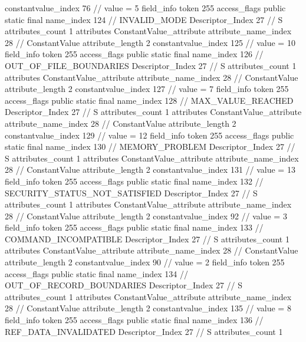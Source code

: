 {{{{{{{					constantvalue_index	76		// value = 5
				}
				}
			}
			field_info {
				token	255
				access_flags	public static final
				name_index	124		// INVALID_MODE
				Descriptor_Index	27		// S
				attributes_count	1
				attributes {
				ConstantValue_attribute {
					attribute_name_index	28		// ConstantValue
					attribute_length	2
					constantvalue_index	125		// value = 10
				}
				}
			}
			field_info {
				token	255
				access_flags	public static final
				name_index	126		// OUT_OF_FILE_BOUNDARIES
				Descriptor_Index	27		// S
				attributes_count	1
				attributes {
				ConstantValue_attribute {
					attribute_name_index	28		// ConstantValue
					attribute_length	2
					constantvalue_index	127		// value = 7
				}
				}
			}
			field_info {
				token	255
				access_flags	public static final
				name_index	128		// MAX_VALUE_REACHED
				Descriptor_Index	27		// S
				attributes_count	1
				attributes {
				ConstantValue_attribute {
					attribute_name_index	28		// ConstantValue
					attribute_length	2
					constantvalue_index	129		// value = 12
				}
				}
			}
			field_info {
				token	255
				access_flags	public static final
				name_index	130		// MEMORY_PROBLEM
				Descriptor_Index	27		// S
				attributes_count	1
				attributes {
				ConstantValue_attribute {
					attribute_name_index	28		// ConstantValue
					attribute_length	2
					constantvalue_index	131		// value = 13
				}
				}
			}
			field_info {
				token	255
				access_flags	public static final
				name_index	132		// SECURITY_STATUS_NOT_SATISFIED
				Descriptor_Index	27		// S
				attributes_count	1
				attributes {
				ConstantValue_attribute {
					attribute_name_index	28		// ConstantValue
					attribute_length	2
					constantvalue_index	92		// value = 3
				}
				}
			}
			field_info {
				token	255
				access_flags	public static final
				name_index	133		// COMMAND_INCOMPATIBLE
				Descriptor_Index	27		// S
				attributes_count	1
				attributes {
				ConstantValue_attribute {
					attribute_name_index	28		// ConstantValue
					attribute_length	2
					constantvalue_index	90		// value = 2
				}
				}
			}
			field_info {
				token	255
				access_flags	public static final
				name_index	134		// OUT_OF_RECORD_BOUNDARIES
				Descriptor_Index	27		// S
				attributes_count	1
				attributes {
				ConstantValue_attribute {
					attribute_name_index	28		// ConstantValue
					attribute_length	2
					constantvalue_index	135		// value = 8
				}
				}
			}
			field_info {
				token	255
				access_flags	public static final
				name_index	136		// REF_DATA_INVALIDATED
				Descriptor_Index	27		// S
				attributes_count	1
}}}}}
